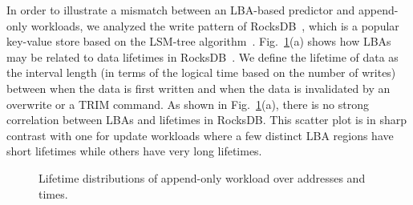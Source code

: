 In order to illustrate a mismatch between an LBA-based predictor and 
append-only workloads, we analyzed the write pattern of 
RocksDB~\cite{RocksDB}, which is a
popular key-value store based on the LSM-tree algorithm~\cite{LSM}.
Fig.~\ref{fig:lba_lifetime}(a) shows how LBAs may be related 
to data lifetimes in RocksDB~\cite{RocksDB}.  
We define the lifetime of data as the interval length (in terms of
the logical time based on the number of writes) between
when the data is first written and when the data is invalidated
by an overwrite or a TRIM command.
As shown in Fig.~\ref{fig:lba_lifetime}(a), 
there is no strong correlation between LBAs and lifetimes in RocksDB.  
This scatter plot is in sharp contrast with one for update workloads 
where a few distinct LBA regions have short lifetimes while others 
have very long lifetimes.

\begin{figure}[t]
	\centering
	\hfill
	\hspace{10pt}
	\caption{Lifetime distributions of append-only workload over addresses and times.} %
	\label{fig:lba_lifetime}
\end{figure}


